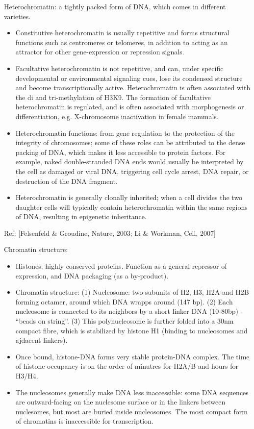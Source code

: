 \documentclass{report}
\begin{document}
Heterochromatin: a tightly packed form of DNA, which comes in different varieties. 
\begin{itemize}
	\item Constitutive heterochromatin is usually repetitive and forms structural functions such as centromeres or telomeres, in addition to acting as an attractor for other gene-expression or repression signals. 
	\item Facultative heterochromatin is not repetitive, and can, under specific developmental or environmental signaling cues, lose its condensed structure and become transcriptionally active. Heterochromatin is often associated with the di and tri-methylation of H3K9. The formation of facultative heterochromatin is regulated, and is often associated with morphogenesis or differentiation, e.g. X-chromosome inactivation in female mammals. 
	\item Heterochromatin functions: from gene regulation to the protection of the integrity of chromosomes; some of these roles can be attributed to the dense packing of DNA, which makes it less accessible to protein factors. For example, naked double-stranded DNA ends would usually be interpreted by the cell as damaged or viral DNA, triggering cell cycle arrest, DNA repair, or destruction of the DNA fragment.
	\item Heterochromatin is generally clonally inherited; when a cell divides the two daughter cells will typically contain heterochromatin within the same regions of DNA, resulting in epigenetic inheritance. 
\end{itemize}

Ref: [Felsenfeld \& Groudine, Nature, 2003; Li \& Workman, Cell, 2007]

Chromatin structure: 
\begin{itemize}
	\item Histones: highly conserved proteins. Function as a general repressor of expression, and DNA packaging (as a by-product). 
	\item Chromatin structure: (1) Nucleosome: two subunits of H2, H3, H2A and H2B forming octamer, around which DNA wrapps around (147 bp). (2) Each nucleosome is connected to its neighbors by a short linker DNA (10-80bp) - ``beads on string''. (3) This polynucleosome is further folded into a 30nm compact fibre, which is stabilized by histone H1 (binding to nucleosomes and ajdacent linkers). 
	\item Once bound, histone-DNA forms very stable protein-DNA complex. The time of histone occupancy is on the order of minutres for H2A/B and hours for H3/H4. 
	\item The nucleosomes generally make DNA less inaccessible: some DNA sequences are outward-facing on the nuclesome surface or in the linkers between nuclesomes, but most are buried inside nucleosomes. The most compact form of chromatins is inaccessible for transcription. 
\end{itemize}
\end{document}
